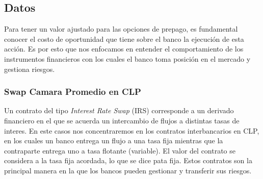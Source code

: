 \subsection{Datos}

\qquad Para tener un valor ajustado para las opciones de prepago, es fundamental conocer el costo de oportunidad que tiene sobre el banco la ejecución de esta acción. Es por esto que nos enfocamos en entender el comportamiento de los instrumentos financieros con los cuales el banco toma posición en el mercado y gestiona riesgos.

\subsubsection{Swap Camara Promedio en CLP}

\qquad Un contrato del tipo \textit{Interest Rate Swap} (IRS) corresponde a un derivado financiero en el que se acuerda un intercambio de flujos a distintas tasas de interes. En este casos nos concentraremos en los contratos interbancarios en CLP, en los cuales un banco entrega un flujo a una tasa fija mientras que la contraparte entrega uno a tasa flotante (variable). El valor del contrato se considera a la tasa fija acordada, lo que se dice pata fija. Estos contratos son la principal manera en la que los bancos pueden gestionar y transferir sus riesgos.

